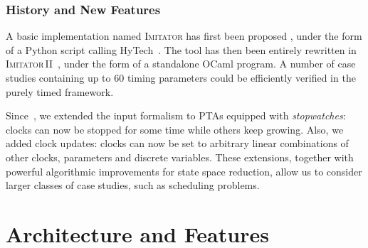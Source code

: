 \documentclass{llncs}
\newcommand{\IM}{\mathit{IM}}
\newcommand{\hytech}{{\sc HyTech}}
\newcommand{\imitator}{\textsc{Imitator}}
\newcommand{\imitatordeux}{\textsc{Imitator}\,II}
\newcommand{\ocaml}{OCaml}
\newcommand{\python}{Python}
\newcommand{\commentaire}[1]{\textcolor{red}{\textbf{$\Leftarrow$  #1 $\Rightarrow$}}}
\begin{document}
\subsubsection*{History and New Features}

A basic implementation named \imitator{} has first been proposed%
, under the form of a \python{} script calling \hytech{}~\cite{hhw97}.
The tool has then been entirely rewritten in \imitatordeux{}~\cite{and10}, under the form of a standalone \ocaml{} program.
A number of case studies containing up to 60 timing parameters could be efficiently verified in the purely timed framework.

Since~\cite{and10}, we extended the input formalism to PTAs equipped with \emph{stopwatches}: clocks can now be stopped for some time while others keep growing.
Also, we added clock updates: clocks can now be set to arbitrary linear combinations of other clocks, parameters
and discrete variables.
These extensions, together with powerful algorithmic improvements for state space reduction, allow us to consider larger classes of case studies, 
such as scheduling problems.


\section{Architecture and Features}
\end{document}
